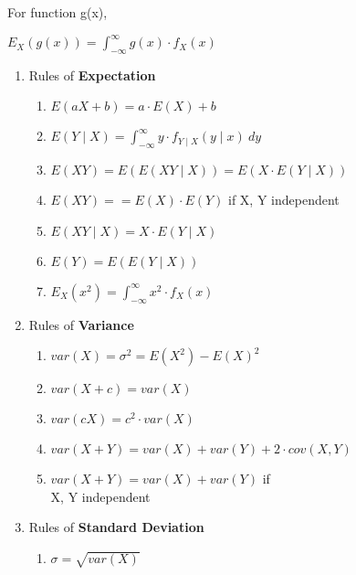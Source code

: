 \documentclass{article}
\begin{document}
\begin{small}
\begin{multicols}{2}
\begin{enumerate}
For function g(x), 

$E_X(g(x)) = \int_{-\infty}^{\infty} g(x) \cdot f_X(x)$

\end{enumerate}

\end{multicols}

\pagebreak


\begin{multicols}{2}
\begin{enumerate}
\item Rules of \textbf{Expectation} 
  \begin{enumerate}
  \item $E(aX + b) = a \cdot E(X) + b$
  \item $E(Y \mid X) = \int_{-\infty}^{\infty} y \cdot f_{Y \mid X}(y \mid x) \ dy$
  \item $E(XY) = E(E(XY \mid X)) = E(X \cdot E(Y \mid X))$
  \item $E(XY) == E(X) \cdot E(Y)$ if X, Y independent
  \item $E(XY \mid X) = X \cdot E(Y \mid X)$
  \item $E(Y) = E(E(Y \mid X))$
  \item $E_X(x^2) = \int_{-\infty}^{\infty} x^2 \cdot f_X(x)$
  \end{enumerate}

\item Rules of \textbf{Variance}
  \begin{enumerate}
  \item $var(X) = \sigma^2 = E(X^2) - E(X)^2$
  \item $var(X + c) = var(X)$
  \item $var(cX) = c^2 \cdot var(X)$
  \item $var(X + Y) = var(X) + var(Y) + 2 \cdot cov(X, Y)$
  \item $var(X + Y) = var(X) + var(Y)$ if\\X, Y independent
  \end{enumerate}

\item Rules of \textbf{Standard Deviation}
  \begin{enumerate}
  \item $\sigma = \sqrt{var(X)}$
  \end{enumerate}


\end{enumerate}
\end{multicols}
\end{small}
\end{document}
